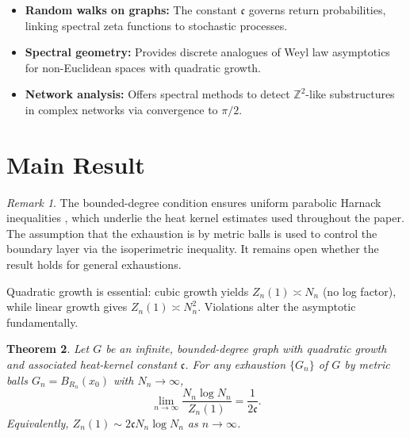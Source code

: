 \documentclass[11pt]{amsart}
\newtheorem{theorem}{Theorem}[section]
\theoremstyle{remark}
\newtheorem{remark}[theorem]{Remark}
\newcommand{\cG}{\mathfrak{c}}      %
\begin{document}
\begin{itemize}
\item \textbf{Random walks on graphs:} The constant $\cG$ governs return probabilities, 
      linking spectral zeta functions to stochastic processes.
\item \textbf{Spectral geometry:} Provides discrete analogues of Weyl law asymptotics 
      for non-Euclidean spaces with quadratic growth.
\item \textbf{Network analysis:} Offers spectral methods to detect $\mathbb{Z}^2$-like 
      substructures in complex networks via convergence to $\pi/2$.
\end{itemize}

\section{Main Result}
\begin{remark}\label{rem:assumptions}
The bounded-degree condition ensures uniform parabolic Harnack inequalities \cite{Delmotte99}, which underlie the heat kernel estimates used throughout the paper. 
The assumption that the exhaustion is by metric balls is used to control the boundary layer via the isoperimetric inequality. 
It remains open whether the result holds for general exhaustions.

Quadratic growth is essential: cubic growth yields $Z_n(1) \asymp N_n$ (no log factor), 
while linear growth gives $Z_n(1) \asymp N_n^2$. Violations alter the asymptotic fundamentally.
\end{remark}
 

\begin{theorem}\label{thm:main}
Let $G$ be an infinite, bounded-degree graph with quadratic growth and
associated heat-kernel constant $\cG$.
For any exhaustion $\{G_n\}$ of $G$ by metric balls $G_n = B_{R_n}(x_0)$ with $N_n\to\infty$,
\[
  \lim_{n\to\infty}\frac{N_n\log N_n}{Z_n(1)}=\frac{1}{2\cG}.
\]
Equivalently, $Z_n(1) \sim 2\cG N_n \log N_n$ as $n\to\infty$.
\end{theorem}
\end{document}

